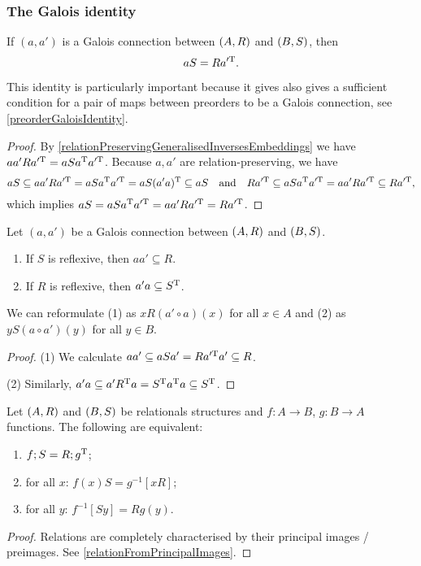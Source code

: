 \subsubsection{The Galois identity}
\begin{proposition} \label{GaloisIdentity}
If $(a,a')$ is a Galois connection between $\left( A,R \right)$ and $\left( B,S \right)$, then
\[ aS = Ra^{\prime \mathrm{T}}. \]
\end{proposition}
This identity is particularly important because it gives also gives a sufficient condition for a pair of maps between preorders to be a Galois connection, see \ref{preorderGaloisIdentity}.
\begin{proof}
By \ref{relationPreservingGeneralisedInversesEmbeddings} we have $aa'R a^{\prime\mathrm{T}} = aSa^{\mathrm{T}} a^{\prime\mathrm{T}}$. Because $a,a'$ are relation-preserving, we have
\[ aS \subseteq aa'R a^{\prime\mathrm{T}} = aSa^{\mathrm{T}} a^{\prime\mathrm{T}} = aS(a'a)^{\mathrm{T}} \subseteq aS \quad\text{and}\quad Ra^{\prime\mathrm{T}} \subseteq aSa^{\mathrm{T}} a^{\prime\mathrm{T}} = aa'R a^{\prime\mathrm{T}} \subseteq Ra^{\prime\mathrm{T}}, \]
which implies $aS = aSa^{\mathrm{T}} a^{\prime\mathrm{T}} = aa'R a^{\prime\mathrm{T}} = Ra^{\prime\mathrm{T}}$.
\end{proof}
\begin{corollary} \label{reflexiveGaloisCorollary}
Let $(a,a')$ be a Galois connection between $\left( A,R \right)$ and $\left( B,S \right)$.
\begin{enumerate}
\item If $S$ is reflexive, then $aa' \subseteq R$.
\item If $R$ is reflexive, then $a'a \subseteq S^{\mathrm{T}}$.
\end{enumerate}
\end{corollary}
We can reformulate (1) as $xR(a'\circ a)(x)$ for all $x\in A$ and (2) as $yS(a\circ a')(y)$ for all $y\in B$.
\begin{proof}
(1) We calculate $aa' \subseteq aSa' = Ra^{\prime \mathrm{T}}a' \subseteq R$.

(2) Similarly, $a'a \subseteq a'R^{\mathrm{T}} a = S^{\mathrm{T}} a^{\mathrm{T}} a \subseteq S^{\mathrm{T}}$.
\end{proof}

\begin{lemma} \label{preimagesGaloisIdentity}
Let $\left( A, R \right)$ and $\left( B, S \right)$ be relationals structures and $f: A\to B$, $g: B\to A$ functions.
The following are equivalent:
\begin{enumerate}
\item $f;S = R;g^{\mathrm{T}}$;
\item for all $x$: $f(x)S = g^{-1}[xR]$;
\item for all $y$: $f^{-1}[Sy] = Rg(y)$.
\end{enumerate}
\end{lemma}
\begin{proof}
Relations are completely characterised by their principal images / preimages. See \ref{relationFromPrincipalImages}.
\end{proof}

